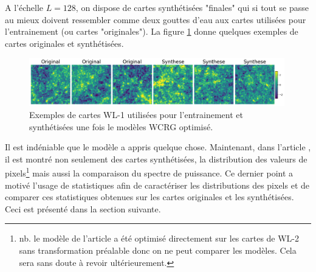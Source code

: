 \documentclass[12pt,twoside]{article}
\begin{document}
A l'échelle $L=128$, on dispose de cartes synthétisées "finales" qui si tout se passe au mieux doivent ressembler comme deux gouttes d'eau aux cartes utilisées pour l'entrainement (ou cartes "originales"). La figure \ref{fig-WL1-synt-exemples} donne quelques exemples de cartes originales et synthétisées.
%
\begin{figure}
\centering
\includegraphics[width=0.99\textwidth]{fig-WL1-synt-exemples.png}
\caption{Exemples de cartes WL-1 utilisées pour l'entrainement et synthétisées une fois le modèles WCRG optimisé.}
\label{fig-WL1-synt-exemples}
\end{figure}
% 
Il est indéniable que le modèle a appris quelque chose. Maintenant, dans l'article \citep{2023arXiv230600181G}, il est montré non seulement des cartes synthétisées, la distribution des valeurs de pixels\footnote{nb. le modèle de l'article a été optimisé directement sur les cartes de WL-2 sans transformation préalable donc on ne peut comparer les modèles. Cela sera sans doute à revoir ultérieurement.} mais aussi la comparaison  du spectre de puissance. Ce dernier point a motivé l'usage de statistiques afin de caractériser les distributions des pixels et de comparer ces statistiques obtenues sur les cartes originales et les synthétisées. Ceci est présenté dans la section suivante.
%
\end{document}
